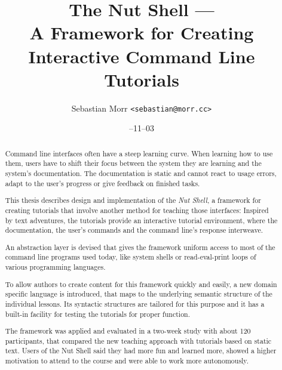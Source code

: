 \documentclass[paper=a4,twoside,abstract=on,cleardoublepage=empty,numbers=noenddot,toc=bib,12pt,appendixprefix=true]{scrreprt}
\title{The Nut Shell ---\\A Framework for Creating\\Interactive Command Line Tutorials}
\author{\sffamily Sebastian Morr \texttt{<sebastian@morr.cc>}}
\date{\sffamily 2013--11--03}
\begin{document}
\maketitle
\restoregeometry


\begin{abstract}
    Command line interfaces often have a steep learning curve. When learning how to use them, users have to shift their focus between the system they are learning and the system's documentation. The documentation is static and cannot react to usage errors, adapt to the user's progress or give feedback on finished tasks.

    This thesis describes design and implementation of the \emph{Nut Shell}, a framework for creating tutorials that involve another method for teaching those interfaces: Inspired by text adventures, the tutorials provide an interactive tutorial environment, where the documentation, the user's commands and the command line's response interweave.

    An abstraction layer is devised that gives the framework uniform access to most of the command line programs used today, like system shells or read-eval-print loops of various programming languages.

    To allow authors to create content for this framework quickly and easily, a new domain specific language is introduced, that maps to the underlying semantic structure of the individual lessons. Its syntactic structures are tailored for this purpose and it has a built-in facility for testing the tutorials for proper function.

    The framework was applied and evaluated in a two-week study with about 120 participants, that compared the new teaching approach with tutorials based on static text. Users of the Nut Shell said they had more fun and learned more, showed a higher motivation to attend to the course and were able to work more autonomously.
\end{abstract}

%
\begin{abstract}
\end{abstract}
%
\end{document}
